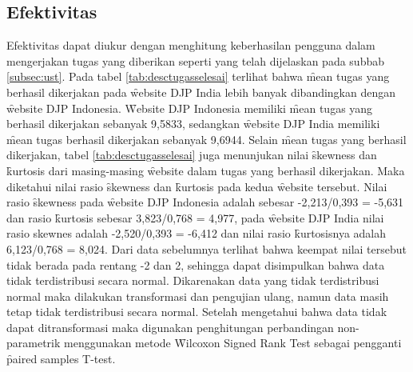 \subsection{Efektivitas}
Efektivitas dapat diukur dengan menghitung keberhasilan pengguna dalam mengerjakan tugas yang diberikan seperti yang telah dijelaskan pada subbab \ref{subsec:ust}. Pada tabel \ref{tab:desctugasselesai} terlihat bahwa \f{mean} tugas yang berhasil dikerjakan pada \f{website} DJP India lebih banyak dibandingkan dengan \f{website} DJP Indonesia. \f{Website} DJP Indonesia memiliki \f{mean} tugas yang berhasil dikerjakan sebanyak 9,5833, sedangkan \f{website} DJP India memiliki \f{mean} tugas berhasil dikerjakan sebanyak 9,6944. Selain \f{mean} tugas yang berhasil dikerjakan, tabel \ref{tab:desctugasselesai} juga menunjukan nilai \f{skewness} dan \f{kurtosis} dari masing-masing \f{website} dalam tugas yang berhasil dikerjakan. Maka diketahui nilai rasio \f{skewness} dan \f{kurtosis} pada kedua \f{website} tersebut. Nilai rasio \f{skewness} pada \f{website} DJP Indonesia adalah sebesar -2,213/0,393 = -5,631 dan rasio \f{kurtosis} sebesar 3,823/0,768 = 4,977, pada \f{website} DJP India nilai rasio skewnes adalah -2,520/0,393 = -6,412 dan nilai rasio \f{kurtosis}nya adalah 6,123/0,768 = 8,024. Dari data sebelumnya terlihat bahwa keempat nilai tersebut tidak berada pada rentang -2 dan 2, sehingga dapat disimpulkan bahwa data tidak terdistribusi secara normal. Dikarenakan data yang tidak terdistribusi normal maka dilakukan transformasi dan pengujian ulang, namun data masih tetap tidak terdistribusi secara normal. Setelah mengetahui bahwa data tidak dapat ditransformasi maka digunakan penghitungan perbandingan non-parametrik menggunakan metode \f{Wilcoxon Signed Rank Test} sebagai pengganti \f{paired samples T-test}.
